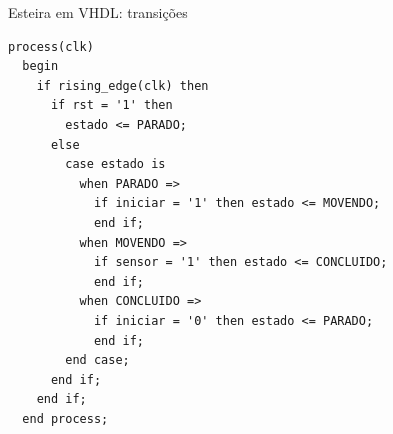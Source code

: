 \begin{frame}[fragile,t]{Esteira em VHDL: transições}
\begin{lstlisting}[basicstyle=\ttfamily\fontsize{7}{8}\selectfont]
  process(clk)
  begin
    if rising_edge(clk) then
      if rst = '1' then
        estado <= PARADO;
      else
        case estado is
          when PARADO =>
            if iniciar = '1' then estado <= MOVENDO;
            end if;
          when MOVENDO =>
            if sensor = '1' then estado <= CONCLUIDO;
            end if;
          when CONCLUIDO =>
            if iniciar = '0' then estado <= PARADO;
            end if;
        end case;
      end if;
    end if;
  end process;
\end{lstlisting}
\end{frame}
